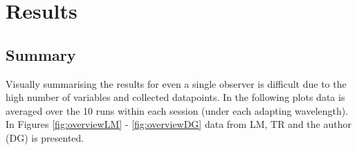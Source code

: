 
\section{Results}

\subsection{Summary}

Visually summarising the results for even a single observer is difficult due to the high number of variables and collected datapoints. In the following plots data is averaged over the 10 runs within each session (under each adapting wavelength). In Figures \ref{fig:overviewLM} - \ref{fig:overviewDG} data from LM, TR and the author (DG) is presented.

